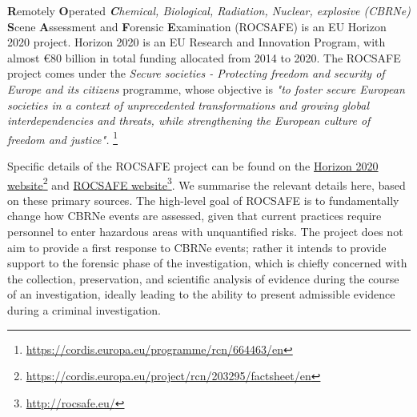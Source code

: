 \textbf{R}emotely \textbf{O}perated \textit{\textbf{C}hemical, Biological, Radiation, Nuclear, explosive (CBRNe)} \textbf{S}cene \textbf{A}ssessment and \textbf{F}orensic \textbf{E}xamination (ROCSAFE) is an EU Horizon 2020 project. Horizon 2020 is an EU Research and Innovation Program, with almost €80 billion in total funding allocated from 2014 to 2020. The ROCSAFE project comes under the \textit{Secure societies - Protecting freedom and security of Europe and its citizens} programme, whose objective is \textit{"to foster secure European societies in a context of unprecedented transformations and growing global interdependencies and threats, while strengthening the European culture of freedom and justice".}
\href{https://cordis.europa.eu/programme/rcn/664463/en}{ }\footnote{\href {https://cordis.europa.eu/programme/rcn/664463/en}{https://cordis.europa.eu/programme/rcn/664463/en}}

Specific details of the ROCSAFE project can be found on the \href{https://cordis.europa.eu/project/rcn/203295/factsheet/en}{Horizon 2020 website}\footnote{\href {https://cordis.europa.eu/project/rcn/203295/factsheet/en}{https://cordis.europa.eu/project/rcn/203295/factsheet/en}} 
and 
\href{http://rocsafe.eu/}{ROCSAFE website}\footnote{\href {http://rocsafe.eu/}{http://rocsafe.eu/}}. We summarise the relevant details here, based on these primary sources. The high-level goal of ROCSAFE is to fundamentally change how CBRNe events are assessed, given that current practices require personnel to enter hazardous areas with unquantified risks. The project does not aim to provide a first response to CBRNe events; rather it intends to provide support to the forensic phase of the investigation, which is chiefly concerned with the collection, preservation, and scientific analysis of evidence during the course of an investigation, ideally leading to the ability to present admissible evidence during a criminal investigation. 


